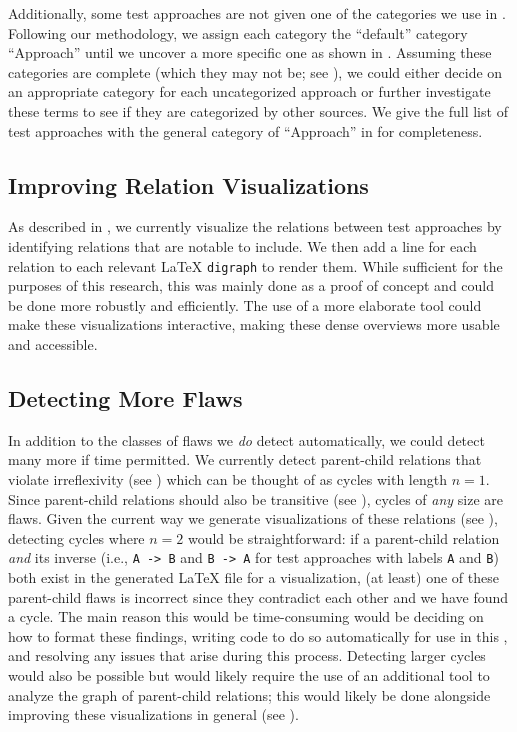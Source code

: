 Additionally, some test approaches are not given one of the categories we use
in . Following our methodology, we assign each category the
``default'' category ``Approach'' until we uncover a more specific one as
shown in . Assuming these categories are complete
(which they may not be; see ), we could either decide on an
appropriate category for each uncategorized approach or further investigate
these terms to see if they are categorized by other sources. We give the
full list of test approaches with the general category of ``Approach'' in
 for completeness.

\subsection{Improving Relation Visualizations}\label{future-rel-vis}
As described in , we currently visualize the relations
between test approaches by identifying relations that are notable to include.
We then add a line for each relation to each relevant \LaTeX{}
\texttt{digraph} to render them. While sufficient for the purposes of this
research, this was mainly done as a proof of concept and
could be done more robustly and efficiently. The use of a more elaborate tool
could make these visualizations interactive, making these dense overviews more
usable and accessible.

\subsection{Detecting More Flaws}\label{future-detect-flaws}
In addition to the classes of flaws we \emph{do} detect automatically, we could
detect many more if time permitted. We currently detect parent-child relations
that violate irreflexivity (see ) which can be thought of as
cycles with length $n=1$. Since parent-child relations should also be
transitive (see ), cycles of \emph{any} size are flaws.
Given the current way we generate visualizations of these relations (see
), detecting cycles where $n=2$ would be straightforward: if
a parent-child relation \emph{and} its inverse (i.e., \texttt{A~->~B} and
\texttt{B~->~A} for test approaches with labels \texttt{A} and \texttt{B}) both
exist in the generated \LaTeX{} file for a visualization, (at least) one of
these parent-child flaws is incorrect since they contradict each other and we
have found a cycle. The main reason this would be time-consuming would be
deciding on how to format these findings, writing code to do so automatically
for use in this \docType{}, and resolving any issues that arise during this
process. Detecting larger cycles would also be possible but would likely
require the use of an additional tool to analyze the graph of parent-child
relations; this would likely be done alongside improving these visualizations
in general (see ).

